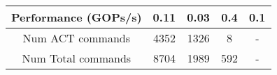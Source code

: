 \begin{table}[t!]
\begin{center}
{\begin{tabular}{|c|c|c|c|c|}
    \hline
    {Performance (GOPs/s)}      &              0.11               &               0.03                &           0.4      &    0.1\\
    \hline
    {Num ACT commands}          &              4352               &               1326                &            8        &    -\\
    \hline
    {Num Total commands}        &              8704               &               1989                &           592      &    -\\
    \hline
    \end{tabular}%
}
\end{center}
\vskip -0.24in
\end{table}

